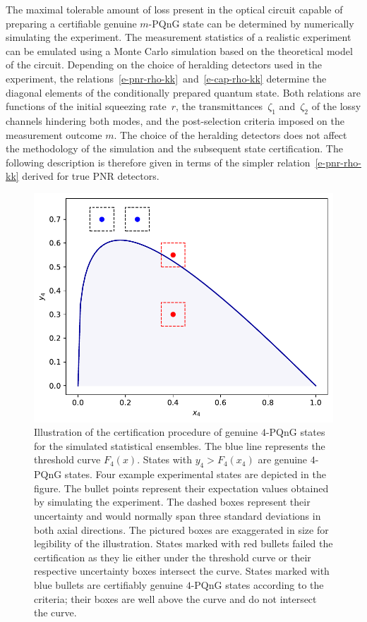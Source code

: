 \documentclass{article}
\begin{document}
The maximal tolerable amount of loss present in the optical circuit capable of preparing a certifiable genuine $m$-PQnG state can be determined by numerically simulating the experiment. The measurement statistics of a realistic experiment can be emulated using a Monte Carlo simulation based on the theoretical model of the circuit. Depending on the choice of heralding detectors used in the experiment, the relations~\eqref{e-pnr-rho-kk}~and~\eqref{e-cap-rho-kk} determine the diagonal elements of the conditionally prepared quantum state. Both relations are functions of the initial squeezing rate~$r$, the transmittances~$\zeta_{1}$ and~$\zeta_{2}$ of the lossy channels hindering both modes, and the post-selection criteria imposed on the measurement outcome $m$. The choice of the heralding detectors does not affect the methodology of the simulation and the subsequent state certification. The following description is therefore given in terms of the simpler relation~\eqref{e-pnr-rho-kk} derived for true PNR detectors.

\begin{figure}[h]
  \begin{center}
    \includegraphics[width = 0.50 \columnwidth]{import/illustrate_lachman_curve.pdf}
  \end{center}
  \caption{
    Illustration of the certification procedure of genuine $4$-PQnG states for the simulated statistical ensembles. The blue line represents the threshold curve $F_{4} (x)$. States with $y_{4} > F_{4}(x_{4})$ are genuine $4$-PQnG states. Four example experimental states are depicted in the figure. The bullet points represent their expectation values obtained by simulating the experiment. The dashed boxes represent their uncertainty and would normally span three standard deviations in both axial directions. The pictured boxes are exaggerated in size for legibility of the illustration. States marked with red bullets failed the certification as they lie either under the threshold curve or their respective uncertainty boxes intersect the curve. States marked with blue bullets are certifiably genuine $4$-PQnG states according to the criteria; their boxes are well above the curve and do not intersect the curve.
  }
  \label{f-otm-il}
\end{figure}
\end{document}
